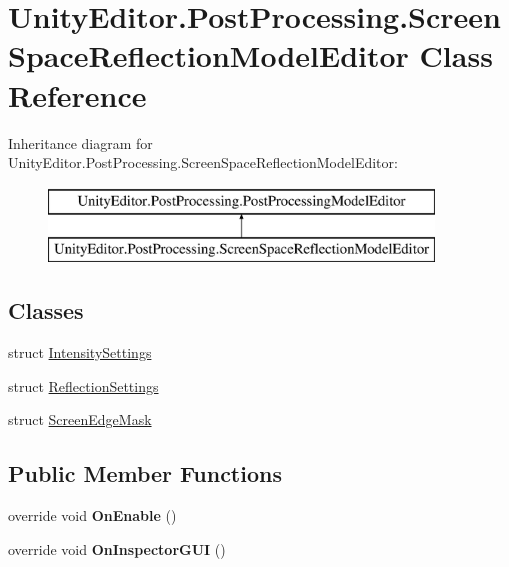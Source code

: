 \hypertarget{class_unity_editor_1_1_post_processing_1_1_screen_space_reflection_model_editor}{}\section{Unity\+Editor.\+Post\+Processing.\+Screen\+Space\+Reflection\+Model\+Editor Class Reference}
\label{class_unity_editor_1_1_post_processing_1_1_screen_space_reflection_model_editor}
Inheritance diagram for Unity\+Editor.\+Post\+Processing.\+Screen\+Space\+Reflection\+Model\+Editor\+:\begin{figure}[H]
\begin{center}
\leavevmode
\includegraphics[height=2.000000cm]{class_unity_editor_1_1_post_processing_1_1_screen_space_reflection_model_editor}
\end{center}
\end{figure}
\subsection*{Classes}
\begin{DoxyCompactItemize}
\item 
struct \hyperlink{struct_unity_editor_1_1_post_processing_1_1_screen_space_reflection_model_editor_1_1_intensity_settings}{Intensity\+Settings}
\item 
struct \hyperlink{struct_unity_editor_1_1_post_processing_1_1_screen_space_reflection_model_editor_1_1_reflection_settings}{Reflection\+Settings}
\item 
struct \hyperlink{struct_unity_editor_1_1_post_processing_1_1_screen_space_reflection_model_editor_1_1_screen_edge_mask}{Screen\+Edge\+Mask}
\end{DoxyCompactItemize}
\subsection*{Public Member Functions}
\begin{DoxyCompactItemize}
\item 
\mbox{\label{class_unity_editor_1_1_post_processing_1_1_screen_space_reflection_model_editor_a82b863023f5322483c601ce1bcc254d1}} 
override void {\bfseries On\+Enable} ()
\item 
\mbox{\label{class_unity_editor_1_1_post_processing_1_1_screen_space_reflection_model_editor_afa95d659e07fb98f2c08129dc2a51ca1}} 
override void {\bfseries On\+Inspector\+G\+UI} ()
\end{DoxyCompactItemize}
